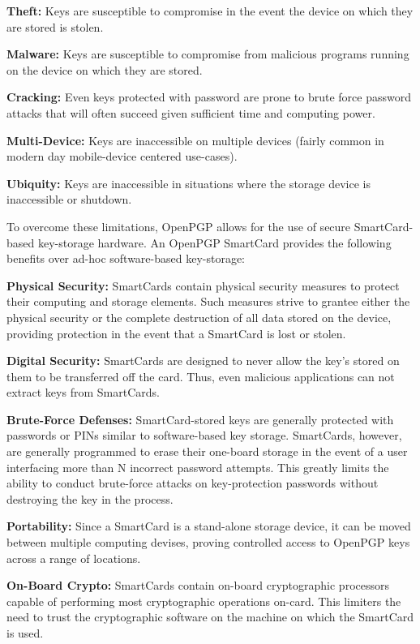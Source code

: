\documentclass[11pt, twocolumn]{article}
\newenvironment{packed_desc}{
\begin{description}
  \setlength{\itemsep}{1pt}
  \setlength{\parskip}{0pt}
  \setlength{\parsep}{0pt}
}{\end{description}}
\begin{document}
\begin{packed_desc}
\item{\textbf{Theft:}} Keys are susceptible to compromise in the event
  the device on which they are stored is stolen.
\item{\textbf{Malware:}} Keys are susceptible to compromise from
  malicious programs running on the device on which they are stored.
\item{\textbf{Cracking:}} Even keys protected with password are prone
  to brute force password attacks that will often succeed given
  sufficient time and computing power.
\item{\textbf{Multi-Device:}} Keys are inaccessible on multiple
  devices (fairly common in modern day mobile-device centered
  use-cases).
\item{\textbf{Ubiquity:}} Keys are inaccessible in situations where
  the storage device is inaccessible or shutdown.
\end{packed_desc}

To overcome these limitations, OpenPGP allows for the use of secure
SmartCard-based key-storage hardware. An OpenPGP SmartCard provides
the following benefits over ad-hoc software-based key-storage:

\begin{packed_desc}
\item{\textbf{Physical Security:}} SmartCards contain physical
  security measures to protect their computing and storage
  elements. Such measures strive to grantee either the physical
  security or the complete destruction of all data stored on the
  device, providing protection in the event that a SmartCard is lost
  or stolen.
\item{\textbf{Digital Security:}} SmartCards are designed to never
  allow the key's stored on them to be transferred off the card. Thus,
  even malicious applications can not extract keys from SmartCards.
\item{\textbf{Brute-Force Defenses:}} SmartCard-stored keys are
  generally protected with passwords or PINs similar to software-based
  key storage. SmartCards, however, are generally programmed to erase
  their one-board storage in the event of a user interfacing more than
  N incorrect password attempts. This greatly limits the ability to
  conduct brute-force attacks on key-protection passwords without
  destroying the key in the process.
\item{\textbf{Portability:}} Since a SmartCard is a stand-alone
  storage device, it can be moved between multiple computing devises,
  proving controlled access to OpenPGP keys across a range of
  locations.
\item{\textbf{On-Board Crypto:}} SmartCards contain on-board
  cryptographic processors capable of performing most cryptographic
  operations on-card. This limiters the need to trust the
  cryptographic software on the machine on which the SmartCard is
  used.
\end{packed_desc}
\end{document}
